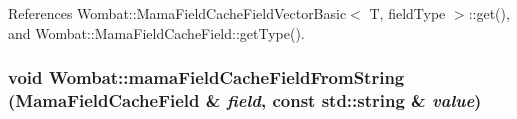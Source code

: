 References Wombat::MamaFieldCacheFieldVectorBasic$<$ T, fieldType $>$::get(), and Wombat::MamaFieldCacheField::getType().\hypertarget{namespaceWombat_a07b7312ba1c685678e4d7787a38e5eb6}{
\subsubsection[{mamaFieldCacheFieldFromString}]{\setlength{\rightskip}{0pt plus 5cm}void Wombat::mamaFieldCacheFieldFromString (MamaFieldCacheField \& {\em field}, \/  const std::string \& {\em value})}}
\label{namespaceWombat_a07b7312ba1c685678e4d7787a38e5eb6}
